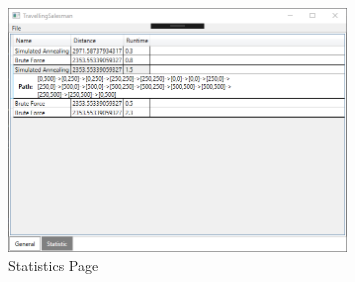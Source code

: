 \documentclass[a4paper, 12pt]{article}
\begin{document}
\begin{figure}[tbh]
    \centering
    \includegraphics[width=0.8\textwidth]{statisticsPage}
    \caption{Statistics Page}
    \label{fig:statistics_page}
\end{figure}
\end{document}
